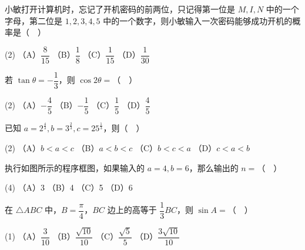\begin{question}
小敏打开计算机时，忘记了开机密码的前两位，只记得第一位是 \(M,I,N\) 中的一个字母，第二位是 \(1,2,3,4,5\) 中的一个数字，则小敏输入一次密码能够成功开机的概率是（　）

\begin{gkopts}(2)
\task （A）\(\dfrac8{15}\)
\task （B）\(\dfrac18\)
\task （C）\(\dfrac1{15}\)
\task （D）\(\dfrac1{30}\)
\end{gkopts}

\end{question}
\begin{question}
若 \(\tan\theta=-\dfrac13\)，则 \(\cos2\theta=\)（　）

\begin{gkopts}(2)
\task （A）\(-\dfrac45\)
\task （B）\(-\dfrac15\)
\task （C）\(\dfrac15\)
\task （D）\(\dfrac45\)
\end{gkopts}

\end{question}
\begin{question}
已知 \(a=2^{\frac43}, b=3^{\frac23}, c=25^{\frac13}\)，则（　）

\begin{gkopts}(2)
\task （A）\(b<a<c\)
\task （B）\(a<b<c\)
\task （C）\(b<c<a\)
\task （D）\(c<a<b\)
\end{gkopts}

\Needspace{0.4\textheight}
\end{question}
\begin{question}
执行如图所示的程序框图，如果输入的 \(a=4,b=6\)，那么输出的 \(n=\)（　）
\nopagebreak[4]
\begin{center}\end{center}
\nopagebreak[4]
\begin{gkopts}(4)
\task （A）3
\task （B）4
\task （C）5
\task （D）6
\end{gkopts}

\end{question}
\begin{question}
在 \(\triangle ABC\) 中，\(B=\dfrac\pi4\)，\(BC\) 边上的高等于 \(\dfrac13BC\)，则 \(\sin A=\)（　）

\begin{gkopts}(1)
\task （A）\(\dfrac3{10}\)
\task （B）\(\dfrac{\sqrt{10}}{10}\)
\task （C）\(\dfrac{\sqrt5}{5}\)
\task （D）\(\dfrac{3\sqrt{10}}{10}\)
\end{gkopts}

\Needspace{0.4\textheight}
\end{question}
